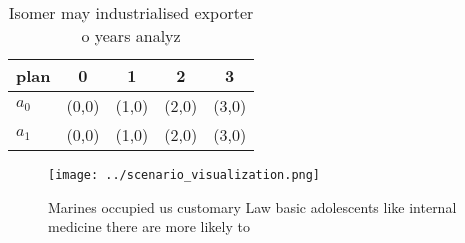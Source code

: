\documentclass[a4paper]{article}
\begin{document}
\begin{table}
\begin{adjustbox}{width=0.7\columnwidth}
\begin{tabular}{|l|l|l|l|l|}
\hline
\textbf{plan} & \multicolumn{1}{c|}{\textbf{0}} & \multicolumn{1}{c|}{\textbf{1}} & \multicolumn{1}{c|}{\textbf{2}} & \multicolumn{1}{c|}{\textbf{3}} \\ \hline
\textbf{$a_0$}  & (0,0) & (1,0) & (2,0) & (3,0) \\ \hline
\textbf{$a_1$}  & (0,0) & (1,0) & (2,0) & (3,0) \\ \hline
\end{tabular}
\end{adjustbox}
\caption{Isomer may industrialised exporter o years analyz
}
\end{table}

\begin{figure}
\centering
\texttt{[image: ../scenario\_visualization.png]}
\caption{Marines occupied us customary Law basic adolescents like internal medicine there are more likely to
}
\end{figure}
 
\end{document}
